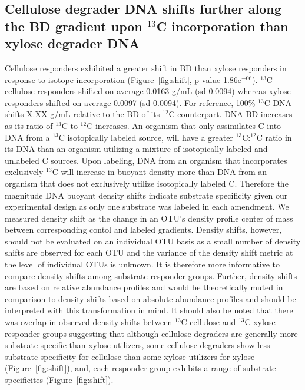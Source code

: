 \subsection{Cellulose degrader DNA shifts further along the BD gradient upon
$^{13}$C incorporation than xylose degrader DNA} 
Cellulose responders exhibited a greater shift in BD than xylose responders in
response to isotope incorporation (Figure~\ref{fig:shift}, p-value
1.86e$^{-06}$). $^{13}$C-cellulose responders shifted on average 0.0163 g/mL
(sd 0.0094) whereas xylose responders shifted on average 0.0097 (sd
0.0094). For reference, 100\% $^{13}$C DNA shifts X.XX g/mL
relative to the BD of its $^{12}$C counterpart. DNA BD increases
as its ratio of $^{13}$C to $^{12}$C increases. An organism that only
assimilates C into DNA from a $^{13}$C isotopically labeled source, will have a
greater $^{13}$C:$^{12}$C ratio in its DNA than an organism utilizing a mixture
of isotopically labeled and unlabeled C sources. Upon labeling, DNA from an
organism that incorporates exclusively $^{13}$C will increase in buoyant density
more than DNA from an organism that does not exclusively utilize
isotopically labeled C. Therefore the magnitude DNA buoyant density shifts
indicate substrate specificity given our experimental design as only one
substrate was labeled in each amendment. We measured density shift
as the change in an OTU's density profile center of mass between corresponding
contol and labeled gradients. Density shifts, however, should not be evaluated
on an individual OTU basis as a small number of density shifts are observed for
each OTU and the variance of the density shift metric at the level of
individual OTUs is unknown. It is therefore more informative to compare density
shifts among substrate responder groups. Further, density shifts are based on
relative abundance profiles and would be theoretically muted in comparison to
density shifts based on absolute abundance profiles and should be interpreted
with this transformation in mind. It should also be noted that there was
overlap in observed density shifts between $^{13}$C-cellulose and
$^{13}$C-xylose responder groups suggesting that although cellulose degraders
are generally more substrate specific than xylose utilizers, some cellulose
degraders show less substrate specificity for cellulose than some xylose
utilizers for xylose (Figure~\ref{fig:shift}), and, each responder group
exhibits a range of substrate specificites (Figure~\ref{fig:shift}).

